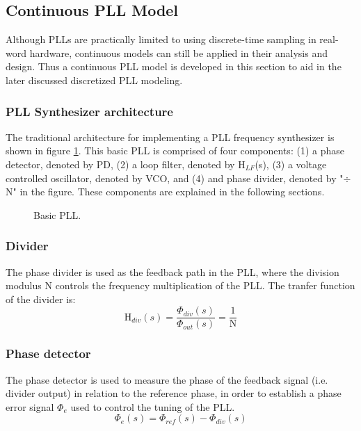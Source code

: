 	\subsection{Continuous PLL Model}
		Although PLLs are practically limited to using discrete-time sampling in real-word hardware, continuous models can still be applied in their analysis and design. Thus a continuous PLL model is developed in this section to aid in the later discussed discretized PLL modeling.

		\subsubsection{PLL Synthesizer architecture}
			The traditional architecture for implementing a PLL frequency synthesizer \cite{Razavi1996DesignOM} is shown in figure \ref{fig:basic_pll}. This basic PLL is comprised of four components: (1) a phase detector, denoted by PD, (2) a loop filter, denoted by H$_{LF}$(s), (3) a voltage controlled oscillator, denoted by VCO, and (4) and phase divider, denoted by "$\div$ N" in the figure. These components are explained in the following sections.
			\begin{figure}[htb!]
				\center
				\caption{Basic PLL.}
				\label{fig:basic_pll}
			\end{figure}
			\FloatBarrier

		\subsubsection{Divider}
			The phase divider is used as the feedback path in the PLL, where the division modulus N controls the frequency multiplication of the PLL. The tranfer function of the divider is:
			\begin{equation}
				\mathrm{H}_{div}(s) = \frac{\Phi_{div}(s)}{\Phi_{out}(s)} = \frac{1}{\mathrm{N}}
			\end{equation}

			\subsubsection{Phase detector}
			The phase detector is used to measure the phase of the feedback signal (i.e. divider output) in relation to the reference phase, in order to establish a phase error signal $\Phi_e$ used to control the tuning of the PLL.
			\begin{equation}
				\Phi_e(s) = \Phi_{ref}(s) - \Phi_{div}(s)
			\end{equation}

